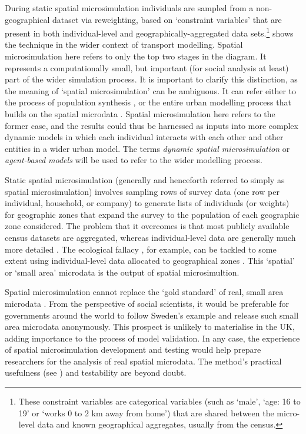 During static spatial microsimulation individuals are sampled from a non-geographical
dataset via  reweighting, based on `constraint variables' that are present in
both individual-level and geographically-aggregated data
sets.\footnote{These
constraint variables are categorical variables (such as
`male', `age: 16 to 19' or `works 0 to 2 km away from home')
that are shared between the micro-level data and
known geographical aggregates, usually from the census.
}
 shows the technique in the wider context of
transport modelling. Spatial microsimulation
here refers to only the top two stages in the diagram. It represents a
computationally small, but important (for social analysis at least)
part of the wider simulation process. It is important to clarify this
distinction, as the meaning of `spatial microsimulation' can be ambiguous.
It can refer
either to the process of population synthesis
\citep{chin2006regional, Ballas2005c, Hynes2008},
or the entire urban modelling process that
builds on the spatial microdata \citep{Wegener2011}.
Spatial microsimulation here refers to the former case, and the results could
thus be harnessed as inputs into more complex dynamic models in which
each individual interacts with each other and other entities in a wider urban model.
The terms \emph{dynamic spatial microsimulation} or \emph{agent-based models}
will be used to refer to the wider modelling process.

Static spatial microsimulation (generally and henceforth referred to simply as
spatial microsimulation) involves sampling rows of
survey data (one row per individual, household, or company) to generate lists of
individuals (or weights) for geographic zones that expand the survey to the
population of each geographic zone considered. The
problem that it overcomes is that most publicly available
census datasets are aggregated, whereas individual-level data are generally
much more detailed \citep{ballas2003microsimulation-30-years}.
The ecological fallacy \citep{Openshaw1983}, for example, can be tackled
to some extent using individual-level data allocated to geographical zones
\citep{Hermes2012a}. This `spatial' or `small area' microdata is the output
of spatial microsimultion.

Spatial microsimulation cannot replace the `gold standard' of real,
small area microdata \citep[p.~4]{Martin2002}. From the perspective of social
scientists, it would be preferable for governments around the world to follow
Sweden's example and release such small area microdata anonymously. This
prospect is unlikely to materialise in the UK, adding importance to the process
of model validation. In any case, the experience of spatial microsimulation
development and testing would help prepare researchers for the analysis of real
spatial microdata. The method's practical usefulness (see \citealp{Tomintz2008})
and testability \citep{Edwards2009} are beyond doubt.

